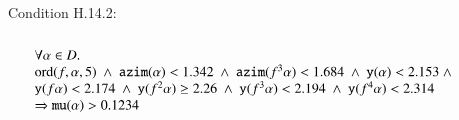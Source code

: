 \noindent
Condition H.14.2:  
$$
\begin{array}{lll}
\leftalign\\
\forall \alpha\in D.\\
  \op{ord}(f,\alpha,5) \sland 
  \optt{azim}(\alpha) < 1.342 \sland
  \optt{azim}(f^3\alpha) < 1.684 \sland
  \optt{y}(\alpha) < 2.153 \sland \\
   \optt{y}(f\alpha) < 2.174 \sland
  \optt{y}(f^2\alpha) \ge 2.26 \sland
  \optt{y}(f^3 \alpha) < 2.194 \sland
  \optt{y}(f^4 \alpha) < 2.314  \\
   \Rightarrow
  \optt{mu}(\alpha) > 0.1234
\end{array}
$$
